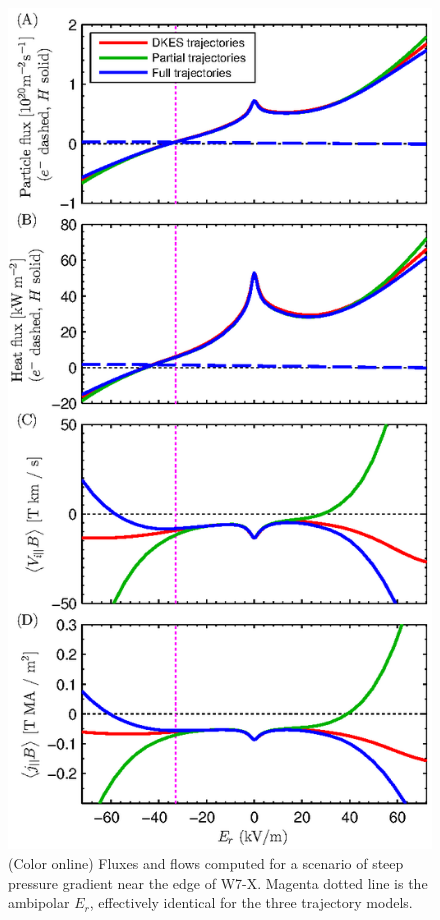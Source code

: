 \documentclass[12pt]{revtex4}
\begin{document}
\begin{figure}[h!]
\includegraphics{m20131212_02_PlotSFINCS2SpeciesEScanForPaper.eps}
\caption{(Color online)
Fluxes and flows computed for a scenario of steep pressure gradient near the edge of W7-X.
Magenta dotted line is the ambipolar $E_r$, effectively identical for the three
trajectory models.
\label{fig:2species}}
\end{figure}
\end{document}
